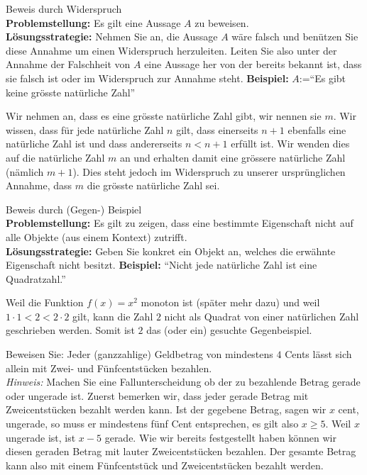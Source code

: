 \begin{KR}{Beweis durch Widerspruch}\\
    \textbf{Problemstellung:} Es gilt eine Aussage $A$ zu beweisen.\\
    \textbf{Lösungsstrategie:} Nehmen Sie an, die Aussage $A$ wäre falsch und benützen Sie diese Annahme um einen Widerspruch herzuleiten. Leiten Sie also unter der Annahme der Falschheit von $A$ eine Aussage her von der bereits bekannt ist, dass sie falsch ist oder im Widerspruch zur Annahme steht.
    \tcblower
    \textbf{Beispiel:} $A$:=``Es gibt keine grösste natürliche Zahl''

    Wir nehmen an, dass es eine grösste natürliche Zahl gibt, wir nennen sie $m$. Wir wissen, dass
    für jede natürliche Zahl $n$ gilt, dass einerseits $n+1$ ebenfalls eine natürliche Zahl ist und dass
    andererseits $n<n+1$ erfüllt ist. Wir wenden dies auf die natürliche Zahl $m$ an und erhalten
    damit eine grössere natürliche Zahl (nämlich $m+1$). Dies steht jedoch im
    Widerspruch zu unserer ursprünglichen Annahme, dass $m$ die grösste natürliche Zahl sei.
\end{KR}

\begin{KR}{Beweis durch (Gegen-) Beispiel}\\
    \textbf{Problemstellung:} Es gilt zu zeigen, dass eine bestimmte Eigenschaft nicht auf alle Objekte (aus einem Kontext) zutrifft.\\
    \textbf{Lösungsstrategie:} Geben Sie konkret ein Objekt an, welches die erwähnte Eigenschaft nicht besitzt.
    \tcblower
    \textbf{Beispiel:} ``Nicht jede natürliche Zahl ist eine Quadratzahl.''

    Weil die Funktion $f(x)=x^2$ monoton ist (später mehr dazu) und weil $1\cdot1<2<2\cdot2$ gilt, kann die Zahl $2$ nicht als Quadrat von einer natürlichen Zahl geschrieben werden. Somit ist $2$ das (oder ein) gesuchte Gegenbeispiel.
\end{KR}

\begin{example}
    Beweisen Sie: Jeder (ganzzahlige) Geldbetrag von mindestens $4$ Cents lässt sich allein mit Zwei- und Fünfcentstücken bezahlen.\\
    \textit{Hinweis:} Machen Sie eine Fallunterscheidung ob der zu bezahlende Betrag gerade oder ungerade ist.
    \tcblower
    Zuerst bemerken wir, dass jeder gerade Betrag mit Zweicentstücken bezahlt werden kann. Ist der gegebene Betrag, sagen wir $x$ cent, ungerade, so muss er mindestens fünf Cent entsprechen, es gilt also $x\geq 5$. Weil $x$ ungerade ist, ist $x-5$ gerade. Wie wir bereits festgestellt haben können wir diesen geraden Betrag mit lauter Zweicentstücken bezahlen. Der gesamte Betrag kann also mit einem Fünfcentstück und Zweicentstücken bezahlt werden.
\end{example}

